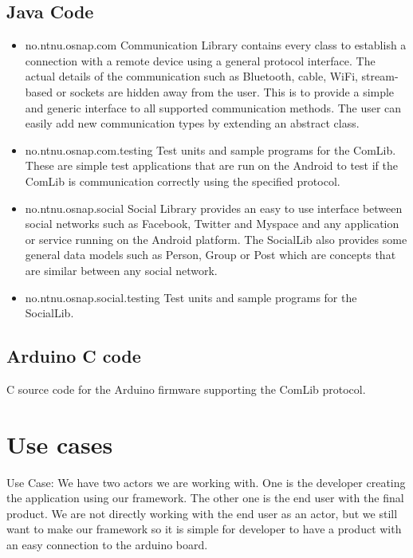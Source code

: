 \subsection{Java Code}
\begin{itemize}
\item{no.ntnu.osnap.com}\newline
Communication Library contains every class to establish a connection with a remote device using a general protocol interface. The actual details of the communication such as
Bluetooth, cable, WiFi, stream-based or sockets are hidden away from the user. This is to provide a simple and generic interface to all supported communication methods. The
user can easily add new communication types by extending an abstract class.
\item{no.ntnu.osnap.com.testing}\newline
Test units and sample programs for the ComLib. These are simple test applications that are run on the Android to test if the ComLib is communication correctly using the specified
protocol.
\item{no.ntnu.osnap.social}\newline
Social Library provides an easy to use interface between social networks such as Facebook, Twitter and Myspace and any application or service running on the Android platform.
The SocialLib also provides some general data models such as Person, Group or Post which are concepts that are similar between any social network. 
\item{no.ntnu.osnap.social.testing}  \newline
Test units and sample programs for the SocialLib.
\end{itemize}

\subsection{Arduino C code}
C source code for the Arduino firmware supporting the ComLib protocol.

\newpage
\section{Use cases}
Use Case:
We have two actors we are working with. One is the developer creating the application using our framework. The other one is the end user with the final product. We are not directly working with the end user as an actor, but we still want to make our framework so it is simple for developer to have a product with an easy connection to the arduino board.


